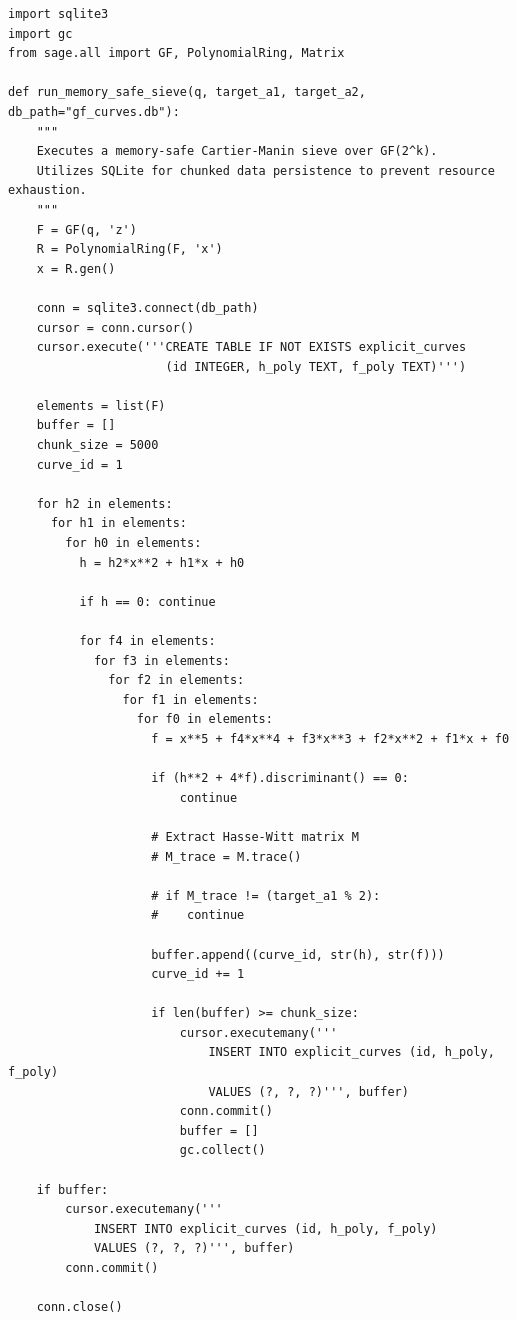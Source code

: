 \documentclass[12pt]{article}
\begin{document}
\begin{verbatim}
import sqlite3
import gc
from sage.all import GF, PolynomialRing, Matrix

def run_memory_safe_sieve(q, target_a1, target_a2, db_path="gf_curves.db"):
    """
    Executes a memory-safe Cartier-Manin sieve over GF(2^k).
    Utilizes SQLite for chunked data persistence to prevent resource exhaustion.
    """
    F = GF(q, 'z')
    R = PolynomialRing(F, 'x')
    x = R.gen()
    
    conn = sqlite3.connect(db_path)
    cursor = conn.cursor()
    cursor.execute('''CREATE TABLE IF NOT EXISTS explicit_curves
                      (id INTEGER, h_poly TEXT, f_poly TEXT)''')
    
    elements = list(F)
    buffer = []
    chunk_size = 5000
    curve_id = 1
    
    for h2 in elements:
      for h1 in elements:
        for h0 in elements:
          h = h2*x**2 + h1*x + h0
          
          if h == 0: continue
          
          for f4 in elements:
            for f3 in elements:
              for f2 in elements:
                for f1 in elements:
                  for f0 in elements:
                    f = x**5 + f4*x**4 + f3*x**3 + f2*x**2 + f1*x + f0
                    
                    if (h**2 + 4*f).discriminant() == 0:
                        continue
                        
                    # Extract Hasse-Witt matrix M
                    # M_trace = M.trace()
                    
                    # if M_trace != (target_a1 % 2):
                    #    continue
                        
                    buffer.append((curve_id, str(h), str(f)))
                    curve_id += 1
                    
                    if len(buffer) >= chunk_size:
                        cursor.executemany('''
                            INSERT INTO explicit_curves (id, h_poly, f_poly)
                            VALUES (?, ?, ?)''', buffer)
                        conn.commit()
                        buffer = []
                        gc.collect() 
                        
    if buffer:
        cursor.executemany('''
            INSERT INTO explicit_curves (id, h_poly, f_poly)
            VALUES (?, ?, ?)''', buffer)
        conn.commit()
        
    conn.close()
\end{verbatim}
\end{document}
